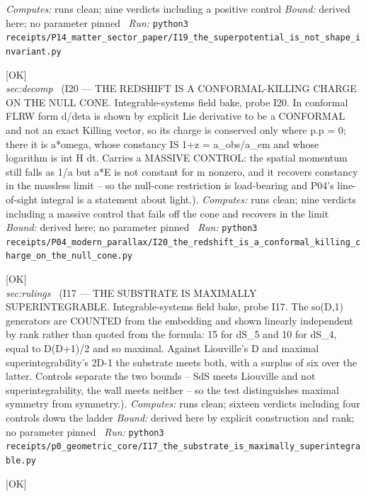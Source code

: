 \begin{description}
\emph{Computes:} runs clean; nine verdicts including a positive control
 \emph{Bound:} derived here; no parameter pinned
\ \emph{Run:} \texttt{python3 receipts/P14\_matter\_sector\_paper/I19\_the\_superpotential\_is\_not\_shape\_invariant.py}
\item[\label{rcpt:I20_the_redshift_is_a_conformal_killing_charge_on_the_null_cone}\texttt{I20\_the\_redshift\_is\_a\_conformal\_killing\_charge\_on\_the\_null\_cone}]\hfill\textsf{[OK]}\\
\textit{sec:decomp} \ (I20 --- THE REDSHIFT IS A CONFORMAL-KILLING CHARGE ON THE NULL CONE. Integrable-systems field bake, probe I20. In conformal FLRW form d/deta is shown by explicit Lie derivative to be a CONFORMAL and not an exact Killing vector, so its charge is conserved only where p.p = 0; there it is a*omega, whose constancy IS 1+z = a\_obs/a\_em and whose logarithm is int H dt. Carries a MASSIVE CONTROL: the spatial momentum still falls as 1/a but a*E is not constant for m nonzero, and it recovers constancy in the massless limit -- so the null-cone restriction is load-bearing and P04's line-of-sight integral is a statement about light.). 
\emph{Computes:} runs clean; nine verdicts including a massive control that fails off the cone and recovers in the limit
 \emph{Bound:} derived here; no parameter pinned
\ \emph{Run:} \texttt{python3 receipts/P04\_modern\_parallax/I20\_the\_redshift\_is\_a\_conformal\_killing\_charge\_on\_the\_null\_cone.py}
\item[\label{rcpt:I17_the_substrate_is_maximally_superintegrable}\texttt{I17\_the\_substrate\_is\_maximally\_superintegrable}]\hfill\textsf{[OK]}\\
\textit{sec:rulings} \ (I17 --- THE SUBSTRATE IS MAXIMALLY SUPERINTEGRABLE. Integrable-systems field bake, probe I17. The so(D,1) generators are COUNTED from the embedding and shown linearly independent by rank rather than quoted from the formula: 15 for dS\_5 and 10 for dS\_4, equal to D(D+1)/2 and so maximal. Against Liouville's D and maximal superintegrability's 2D-1 the substrate meets both, with a surplus of six over the latter. Controls separate the two bounds -- SdS meets Liouville and not superintegrability, the wall meets neither -- so the test distinguishes maximal symmetry from symmetry.). 
\emph{Computes:} runs clean; sixteen verdicts including four controls down the ladder
 \emph{Bound:} derived here by explicit construction and rank; no parameter pinned
\ \emph{Run:} \texttt{python3 receipts/p0\_geometric\_core/I17\_the\_substrate\_is\_maximally\_superintegrable.py}
\item[\label{rcpt:I10_I15_the_horizon_is_a_turning_point_and_a_fixed_point_and_Nariai_degenerates_both}\texttt{I10\_I15\_the\_horizon\_is\_a\_turning\_point\_and\_a\_fixed\_point\_and\_Nariai\_degenerates\_both}]\hfill\textsf{[OK]}\\

\end{description}
